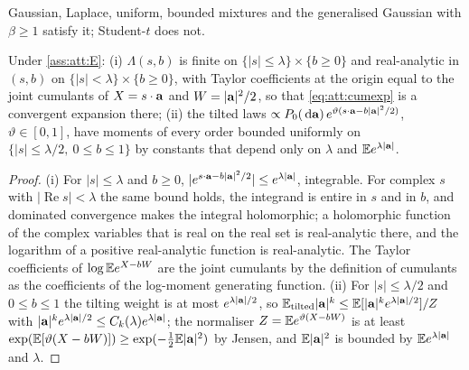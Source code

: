 Gaussian, Laplace, uniform, bounded mixtures and the generalised Gaussian with
$\beta\ge1$ satisfy it; Student-$t$ does not.

\begin{lemma}
\label{lem:att:analytic}
Under \cref{ass:att:E}: (i) $\Lambda(s,b)$ is finite on $\{|s|\le\lambda\}\times\{b\ge0\}$
and real-analytic in $(s,b)$ on $\{|s|<\lambda\}\times\{b\ge0\}$, with Taylor
coefficients at the origin equal to the joint cumulants of $X=s\cdot\mathbf{a}$ and
$W=|\mathbf{a}|^2/2$, so that \cref{eq:att:cumexp} is a convergent expansion there; (ii) the
tilted laws $\propto P_0(\,\mathrm{d}\mathbf{a})\,e^{\vartheta(s\cdot\mathbf{a}-b|\mathbf{a}|^2/2)}$, $\vartheta\in[0,1]$,
have moments of every order bounded uniformly on $\{|s|\le\lambda/2,\ 0\le b\le1\}$ by
constants that depend only on $\lambda$ and $\mathbb{E} e^{\lambda|\mathbf{a}|}$.
\end{lemma}

\begin{proof}
(i) For $|s|\le\lambda$ and $b\ge0$, $|e^{s\cdot\mathbf{a}-b|\mathbf{a}|^2/2}|\le e^{\lambda|\mathbf{a}|}$,
integrable. For complex $s$ with $|\operatorname{Re}s|<\lambda$ the same bound holds,
the integrand is entire in $s$ and in $b$, and dominated convergence makes the integral
holomorphic; a holomorphic function of the complex variables that is real on the real
set is real-analytic there, and the logarithm of a positive real-analytic function is
real-analytic. The Taylor coefficients of $\log\mathbb{E} e^{X-bW}$ are the joint cumulants by
the definition of cumulants as the coefficients of the log-moment generating function.
(ii) For $|s|\le\lambda/2$ and $0\le b\le1$ the tilting weight is at most
$e^{\lambda|\mathbf{a}|/2}$, so $\mathbb{E}_{\text{tilted}}|\mathbf{a}|^k\le\mathbb{E}[|\mathbf{a}|^ke^{\lambda|\mathbf{a}|/2}]/Z$ with
$|\mathbf{a}|^ke^{\lambda|\mathbf{a}|/2}\le C_k(\lambda)e^{\lambda|\mathbf{a}|}$; the normaliser $Z=\mathbb{E} e^{\vartheta(X-bW)}$
is at least $\exp(\mathbb{E}[\vartheta(X-bW)])\ge\exp(-\tfrac12\mathbb{E}|\mathbf{a}|^2)$ by Jensen, and
$\mathbb{E}|\mathbf{a}|^2$ is bounded by $\mathbb{E} e^{\lambda|\mathbf{a}|}$ and $\lambda$.
\end{proof}

